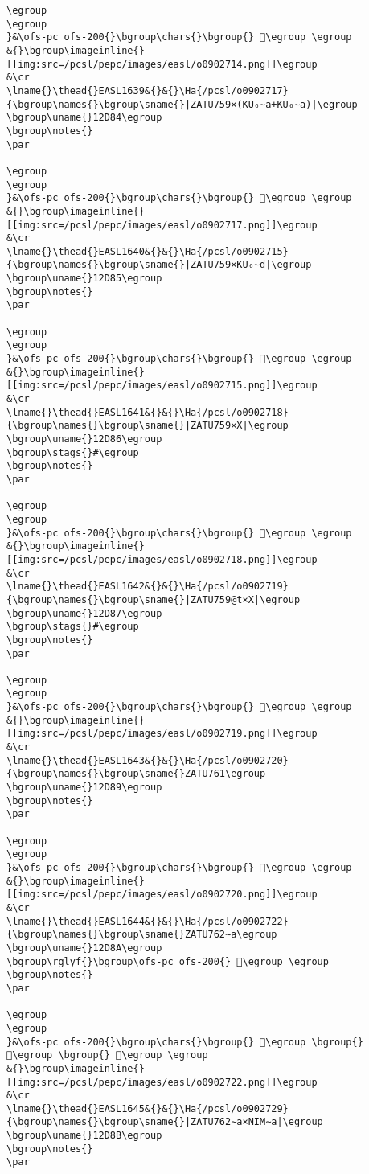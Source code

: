 \begin{verbatim}
\egroup
\egroup
}&\ofs-pc ofs-200{}\bgroup\chars{}\bgroup{} 𒶃\egroup \egroup
&{}\bgroup\imageinline{}[[img:src=/pcsl/pepc/images/easl/o0902714.png]]\egroup
&\cr
\lname{}\thead{}EASL1639&{}&{}\Ha{/pcsl/o0902717}{\bgroup\names{}\bgroup\sname{}|ZATU759×(KU₆∼a+KU₆∼a)|\egroup
\bgroup\uname{}12D84\egroup
\bgroup\notes{}
\par 

\egroup
\egroup
}&\ofs-pc ofs-200{}\bgroup\chars{}\bgroup{} 𒶄\egroup \egroup
&{}\bgroup\imageinline{}[[img:src=/pcsl/pepc/images/easl/o0902717.png]]\egroup
&\cr
\lname{}\thead{}EASL1640&{}&{}\Ha{/pcsl/o0902715}{\bgroup\names{}\bgroup\sname{}|ZATU759×KU₆∼d|\egroup
\bgroup\uname{}12D85\egroup
\bgroup\notes{}
\par 

\egroup
\egroup
}&\ofs-pc ofs-200{}\bgroup\chars{}\bgroup{} 𒶅\egroup \egroup
&{}\bgroup\imageinline{}[[img:src=/pcsl/pepc/images/easl/o0902715.png]]\egroup
&\cr
\lname{}\thead{}EASL1641&{}&{}\Ha{/pcsl/o0902718}{\bgroup\names{}\bgroup\sname{}|ZATU759×X|\egroup
\bgroup\uname{}12D86\egroup
\bgroup\stags{}#\egroup
\bgroup\notes{}
\par 

\egroup
\egroup
}&\ofs-pc ofs-200{}\bgroup\chars{}\bgroup{} 𒶆\egroup \egroup
&{}\bgroup\imageinline{}[[img:src=/pcsl/pepc/images/easl/o0902718.png]]\egroup
&\cr
\lname{}\thead{}EASL1642&{}&{}\Ha{/pcsl/o0902719}{\bgroup\names{}\bgroup\sname{}|ZATU759@t×X|\egroup
\bgroup\uname{}12D87\egroup
\bgroup\stags{}#\egroup
\bgroup\notes{}
\par 

\egroup
\egroup
}&\ofs-pc ofs-200{}\bgroup\chars{}\bgroup{} 𒶇\egroup \egroup
&{}\bgroup\imageinline{}[[img:src=/pcsl/pepc/images/easl/o0902719.png]]\egroup
&\cr
\lname{}\thead{}EASL1643&{}&{}\Ha{/pcsl/o0902720}{\bgroup\names{}\bgroup\sname{}ZATU761\egroup
\bgroup\uname{}12D89\egroup
\bgroup\notes{}
\par 

\egroup
\egroup
}&\ofs-pc ofs-200{}\bgroup\chars{}\bgroup{} 𒶉\egroup \egroup
&{}\bgroup\imageinline{}[[img:src=/pcsl/pepc/images/easl/o0902720.png]]\egroup
&\cr
\lname{}\thead{}EASL1644&{}&{}\Ha{/pcsl/o0902722}{\bgroup\names{}\bgroup\sname{}ZATU762∼a\egroup
\bgroup\uname{}12D8A\egroup
\bgroup\rglyf{}\bgroup\ofs-pc ofs-200{} 𒶊\egroup \egroup
\bgroup\notes{}
\par 

\egroup
\egroup
}&\ofs-pc ofs-200{}\bgroup\chars{}\bgroup{} 𒶍\egroup \bgroup{} 𒶌\egroup \bgroup{} 𒶊\egroup \egroup
&{}\bgroup\imageinline{}[[img:src=/pcsl/pepc/images/easl/o0902722.png]]\egroup
&\cr
\lname{}\thead{}EASL1645&{}&{}\Ha{/pcsl/o0902729}{\bgroup\names{}\bgroup\sname{}|ZATU762∼a×NIM∼a|\egroup
\bgroup\uname{}12D8B\egroup
\bgroup\notes{}
\par 


\end{verbatim}
